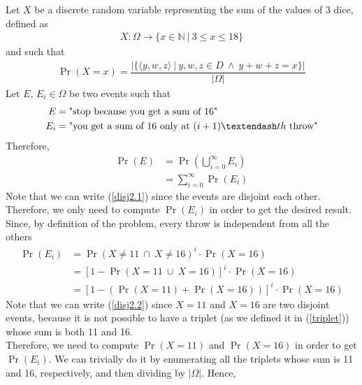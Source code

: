 Let $X$ be a discrete random variable representing the sum of the values of 3 dice, defined as
\begin{align*}
	X: \Omega \rightarrow \{ x \in \mathbb{N} \ | \ 3 \leq x \leq 18 \}
\end{align*}
and such that
\begin{align}
	\Pr(X = x) = \dfrac{|\{ \langle y,w,z \rangle \ | \ y,w,z \in D \ \wedge \ y+w+z = x \}|}{|\Omega|} \label{triplet}
\end{align}
Let $E$, $E_i \in \Omega$ be two events such that
\begin{align*}
	E &= \text{"stop because you get a sum of 16"}\\
	E_i &= \text{"you get a sum of 16 only at $(i+1) \textendash th$ throw"}
\end{align*}
Therefore,
\begin{align}
	\Pr(E) &= \Pr\left(\bigcup_{i = 0}^{\infty} E_i \right) \nonumber\\
		&= \sum_{i = 0}^{\infty}\Pr(E_i) \label{disj2.1}
\end{align}
Note that we can write (\ref{disj2.1}) since the events are disjoint each other.\\
Therefore, we only need to compute $\Pr(E_i)$ in order to get the desired result. Since, by definition of the problem, every throw is independent from all the others
\begin{align}
	\Pr(E_i) &= \Pr( X \ne 11 \ \cap \ X \ne 16 )^i \cdot \Pr(X = 16) \nonumber\\
			&= [1 - \Pr( X = 11 \ \cup \ X = 16)]^i \cdot \Pr(X = 16) \nonumber\\
			&= [1 - (\Pr(X = 11) + \Pr( X = 16))]^i \cdot \Pr(X = 16) \label{disj2.2}
\end{align}
Note that we can write (\ref{disj2.2}) since $X = 11$ and $X = 16$ are two disjoint events, because it is not possible to have a triplet (as we defined it in (\ref{triplet})) whose sum is both 11 and 16.\\
Therefore, we need to compute $\Pr(X = 11)$ and $\Pr( X = 16)$ in order to get $\Pr(E_i)$. We can trivially do it by enumerating all the triplets whose sum is 11 and 16, respectively, and then dividing by $|\Omega|$. Hence,

